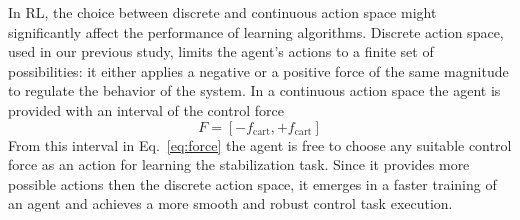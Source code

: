 In RL, the choice between discrete and continuous action space might significantly affect the performance of learning algorithms. Discrete action space, used in our previous study, limits the agent’s actions to a finite set of possibilities: it either applies a negative or a positive force of the same magnitude to regulate the behavior of the system. In a continuous action space the agent is provided with an interval of the control force
\begin{equation}
F = [-f_\mathrm{cart}, +f_\mathrm{cart}]
\label{eq:force}
\end{equation}
From this interval in Eq.~\eqref{eq:force} the agent is free to choose any suitable control force as an action for learning the stabilization task. Since it provides more possible actions then the discrete action space, it emerges in a faster training of an agent and achieves a more smooth and robust control task execution.  

